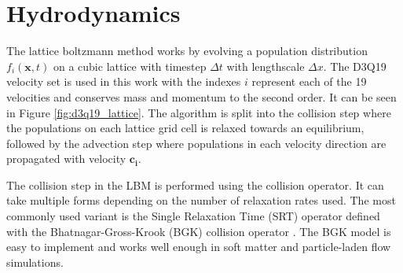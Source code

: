 \section{Hydrodynamics} 
\label{section:lbm_hydrodynamics}

The lattice boltzmann method works by evolving a population distribution $f_{i}(\mathbf{x}, t)$ on a cubic lattice with 
timestep $\Delta t$ with lengthscale $\Delta x$. \cite{qian_lattice_1992, succi_lattice_2018, he_theory_1997} The D3Q19 
velocity set is used in this work with the indexes $i$ represent each of the 19 velocities and conserves mass and momentum 
to the second order. It can be seen in Figure \ref{fig:d3q19_lattice}. The algorithm is split into the 
collision step where the populations on each lattice grid cell is relaxed towards an equilibrium, followed by the 
advection step where populations in each velocity direction are propagated with velocity $\mathbf{c_i}$. 



The collision step in the LBM is performed using the collision operator. It can take multiple forms depending on the number of
relaxation rates used. The most commonly used variant is the Single Relaxation Time (SRT) operator defined with the Bhatnagar-Gross-Krook (BGK) 
collision operator \cite{bhatnagar_model_1954, qian_lattice_1992}. The BGK model is easy to implement and works well enough in soft matter and
particle-laden flow simulations.

